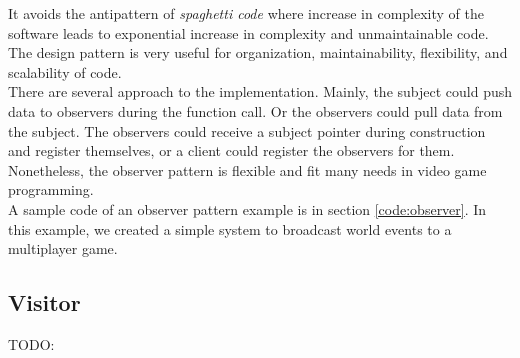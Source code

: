 \begin{multicols}{2}
It avoids the antipattern of \textit{spaghetti code} where increase in complexity of the software leads to exponential increase in complexity and unmaintainable code. The design pattern is very useful for organization, maintainability, flexibility, and scalability of code.\bs
\\
There are several approach to the implementation. Mainly, the subject could push data to observers during the function call. Or the observers could pull data from the subject. The observers could receive a subject pointer during construction and register themselves, or a client could register the observers for them. Nonetheless, the observer pattern is flexible and fit many needs in video game programming.\bs
\\
A sample code of an observer pattern example is in section \ref{code:observer}. In this example, we created a simple system to broadcast world events to a multiplayer game.

\subsection{Visitor}
TODO:


\iftwocolumns
\end{multicols}
\fi
